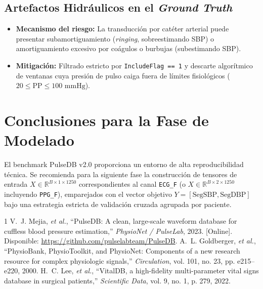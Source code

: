 \documentclass[journal,10pt]{IEEEtran}
\begin{document}
\subsection{Artefactos Hidráulicos en el \textit{Ground Truth}}
\begin{itemize}
    \item \textbf{Mecanismo del riesgo:} La transducción por catéter arterial puede presentar subamortiguamiento (\textit{ringing}, sobreestimando SBP) o amortiguamiento excesivo por coágulos o burbujas (subestimando SBP).
    \item \textbf{Mitigación:} Filtrado estricto por \texttt{IncludeFlag == 1} y descarte algorítmico de ventanas cuya presión de pulso caiga fuera de límites fisiológicos ($20 \le \text{PP} \le 100\text{ mmHg}$).
\end{itemize}

\section{Conclusiones para la Fase de Modelado}
El benchmark PulseDB v2.0 proporciona un entorno de alta reproducibilidad técnica. Se recomienda para la siguiente fase la construcción de tensores de entrada $X \in \mathbb{R}^{B \times 1 \times 1250}$ correspondientes al canal \texttt{ECG\_F} (o $X \in \mathbb{R}^{B \times 2 \times 1250}$ incluyendo \texttt{PPG\_F}), emparejados con el vector objetivo $Y = [\text{SegSBP}, \text{SegDBP}]$ bajo una estrategia estricta de validación cruzada agrupada por paciente.

\begin{thebibliography}{1}
V.~J. Mejia, \textit{et al.}, ``PulseDB: A clean, large-scale waveform database for cuffless blood pressure estimation,'' \textit{PhysioNet / PulseLab}, 2023. [Online]. Disponible: \url{https://github.com/pulselabteam/PulseDB}.
A.~L. Goldberger, \textit{et al.}, ``PhysioBank, PhysioToolkit, and PhysioNet: Components of a new research resource for complex physiologic signals,'' \textit{Circulation}, vol. 101, no. 23, pp. e215--e220, 2000.
H.~C. Lee, \textit{et al.}, ``VitalDB, a high-fidelity multi-parameter vital signs database in surgical patients,'' \textit{Scientific Data}, vol. 9, no. 1, p. 279, 2022.
\end{thebibliography}
\end{document}
